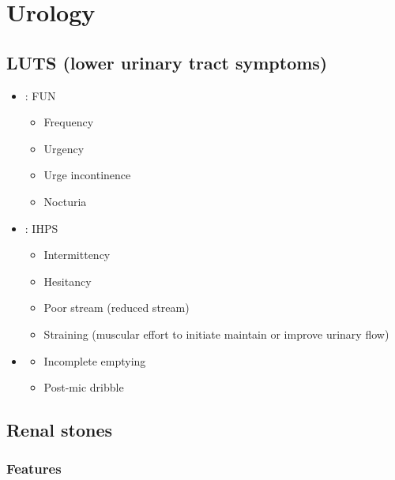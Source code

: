 \documentclass[
  12pt,
]{memoir}
\providecommand{\tightlist}{%
  \setlength{\itemsep}{0pt}\setlength{\parskip}{0pt}}
\begin{document}
\pagebreak

\hypertarget{urology}{%
\chapter{Urology}\label{urology}}

\hypertarget{luts-lower-urinary-tract-symptoms}{%
\section{LUTS (lower urinary tract
symptoms)}\label{luts-lower-urinary-tract-symptoms}}

\begin{itemize}
\tightlist
\item
  \textbf{}: FUN

  \begin{itemize}
  \tightlist
  \item
    Frequency
  \item
    Urgency
  \item
    Urge incontinence
  \item
    Nocturia
  \end{itemize}
\item
  \textbf{}: IHPS

  \begin{itemize}
  \tightlist
  \item
    Intermittency
  \item
    Hesitancy
  \item
    Poor stream (reduced stream)
  \item
    Straining (muscular effort to initiate maintain or improve urinary
    flow)
  \end{itemize}
\item
  \textbf{}

  \begin{itemize}
  \tightlist
  \item
    Incomplete emptying
  \item
    Post-mic dribble
  \end{itemize}
\end{itemize}

\hypertarget{renal-stones}{%
\section{Renal stones}\label{renal-stones}}

\hypertarget{features-4}{%
\subsection{Features}\label{features-4}}
\end{document}
